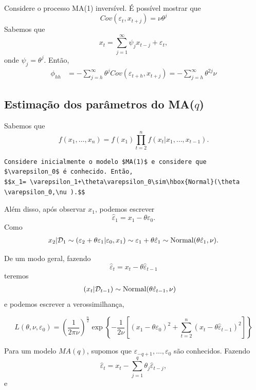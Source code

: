 \documentclass[
  letterpaper,
  DIV=11,
  numbers=noendperiod]{scrartcl}
\theoremstyle{plain}
\theoremstyle{plain}
\theoremstyle{definition}
\theoremstyle{definition}
\theoremstyle{remark}
\begin{document}
\leavevmode{}%
Considere o processo MA(1) inversível. É possível mostrar que
\[Cov(\varepsilon_t,x_{t+j})=\nu\theta^j\] Sabemos que
\[x_t=\sum_{j=1}^\infty \psi_jx_{t-j}+\varepsilon_t,\] onde
\(\psi_j=\theta^j\). Então,
\[\begin{align}\phi_{hh}&=-\sum_{j=h}^\infty\theta^j Cov(\varepsilon_{t+h},x_{t+j})=-\sum_{j=h}^\infty\theta^{2j} \nu\end{align}\]

\hypertarget{estimauxe7uxe3o-dos-paruxe2metros-do-maq}{%
\subsection{\texorpdfstring{Estimação dos parâmetros do
MA(\(q\))}{Estimação dos parâmetros do MA(q)}}\label{estimauxe7uxe3o-dos-paruxe2metros-do-maq}}

Sabemos que
\[f(x_1,\ldots,x_n)=f(x_1)\prod_{t=2}^{n}f(x_t|x_1,\ldots,x_{t-1}).\]

\begin{verbatim}
Considere inicialmente o modelo $MA(1)$ e considere que $\varepsilon_0$ é conhecido. Então,
$$x_1= \varepsilon_1+\theta\varepsilon_0\sim\hbox{Normal}(\theta \varepsilon_0,\nu ).$$
\end{verbatim}

Além disso, após observar \(x_1\), podemos escrever
\[\hat{\varepsilon}_1=x_1-\theta\varepsilon_0.\] Como \[\begin{align*}
x_2|\mathcal{D}_1\sim
    (\varepsilon_2+\theta\varepsilon_1|\varepsilon_0,x_1)\sim\varepsilon_1+\theta\hat{\varepsilon}_1\sim\hbox{Normal}(\theta\hat{\varepsilon}_1,\nu).
    \end{align*}\]

De um modo geral, fazendo
\[\hat{\varepsilon}_t = x_t-\theta\hat{\varepsilon}_{t-1}\] teremos
\[\begin{align*}
    (x_t|\mathcal{D}_{t-1})&\sim  \hbox{Normal}(\theta \hat{\varepsilon}_{t-1},\nu)
    \end{align*}\] e podemos escrever a verossimilhança,

\[L(\theta,\nu,\varepsilon_0)=\left(\frac{1}{2\pi\nu}\right)^{\frac{n}{2}}\exp\left\{-\frac{1}{2\nu}\left[(x_1-\theta\varepsilon_0)^2+\sum_{t=2}^n(x_t-\theta\hat{\varepsilon}_{t-1})^2\right]\right\}\]

Para um modelo \(MA(q)\), supomos que
\(\varepsilon_{-q+1},\ldots,\varepsilon_{0}\) são conhecidos. Fazendo
\[\begin{equation}
    \hat{\varepsilon}_{t}=x_t - \sum_{j=1}^{q}\theta_j\hat{\varepsilon}_{t-j},
    \end{equation}\] e
\end{document}
